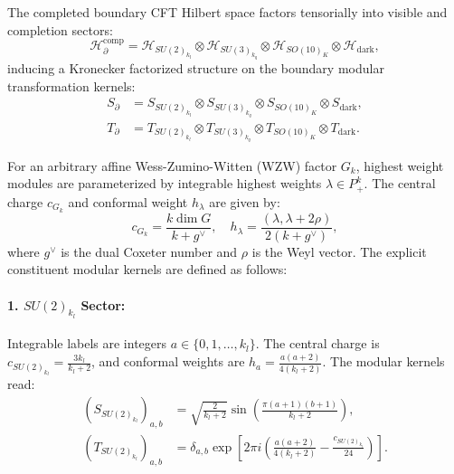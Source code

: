 \documentclass[11pt]{article}
\theoremstyle{plain}
\DeclareMathOperator{\dimop}{dim}
\begin{document}
The completed boundary CFT Hilbert space factors tensorially into visible and completion sectors:
\begin{equation}
\mathcal{H}_{\partial}^{\text{comp}} = \mathcal{H}_{SU(2)_{k_l}} \otimes \mathcal{H}_{SU(3)_{k_q}} \otimes \mathcal{H}_{SO(10)_K} \otimes \mathcal{H}_{\text{dark}},
\end{equation}
inducing a Kronecker factorized structure on the boundary modular transformation kernels:
\begin{align}
S_{\partial} &= S_{SU(2)_{k_l}} \otimes S_{SU(3)_{k_q}} \otimes S_{SO(10)_K} \otimes S_{\text{dark}}, \label{eq:S_tensor} \\
T_{\partial} &= T_{SU(2)_{k_l}} \otimes T_{SU(3)_{k_q}} \otimes T_{SO(10)_K} \otimes T_{\text{dark}}. \label{eq:T_tensor}
\end{align}

For an arbitrary affine Wess-Zumino-Witten (WZW) factor $G_k$, highest weight modules are parameterized by integrable highest weights $\lambda \in P_+^k$. The central charge $c_{G_k}$ and conformal weight $h_\lambda$ are given by:
\begin{equation}
c_{G_k} = \frac{k \dimop G}{k + g^\vee}, \quad h_\lambda = \frac{(\lambda, \lambda + 2\rho)}{2(k + g^\vee)},
\end{equation}
where $g^\vee$ is the dual Coxeter number and $\rho$ is the Weyl vector. The explicit constituent modular kernels are defined as follows:

\paragraph{1. $SU(2)_{k_l}$ Sector:} Integrable labels are integers $a \in \{0, 1, \dots, k_l\}$. The central charge is $c_{SU(2)_{k_l}} = \frac{3k_l}{k_l + 2}$, and conformal weights are $h_a = \frac{a(a+2)}{4(k_l + 2)}$. The modular kernels read:
\begin{align}
(S_{SU(2)_{k_l}})_{a, b} &= \sqrt{\frac{2}{k_l + 2}} \sin\left( \frac{\pi (a + 1)(b + 1)}{k_l + 2} \right), \label{eq:S_su2} \\
(T_{SU(2)_{k_l}})_{a, b} &= \delta_{a, b} \exp\left[ 2\pi i \left( \frac{a(a+2)}{4(k_l + 2)} - \frac{c_{SU(2)_{k_l}}}{24} \right) \right]. \label{eq:T_su2}
\end{align}
\end{document}
